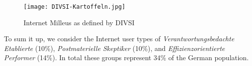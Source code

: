 \begin{figure}[hHtbp]
\centering
\texttt{[image: DIVSI-Kartoffeln.jpg]}
\caption{Internet Milleus as defined by DIVSI}
\label{fig:divsi_kartoffeln}
\end{figure}
To sum it up, we consider the Internet user types of \textit{Verantwortungsbedachte Etablierte} (10\%),  \textit{Postmaterielle Skeptiker} (10\%), and \textit{Effizienzorientierte Performer} (14\%). In total these groups represent 34\% of the German population.